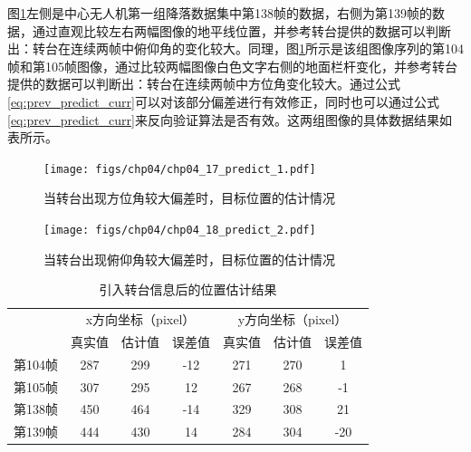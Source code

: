 图\ref{fig:chp04_17_predict_1}左侧是中心无人机第一组降落数据集中第138帧的数据，右侧为第139帧的数据，通过直观比较左右两幅图像的地平线位置，并参考转台提供的数据可以判断出：转台在连续两帧中俯仰角的变化较大。同理，图\ref{fig:chp04_17_predict_1}所示是该组图像序列的第104帧和第105帧图像，通过比较两幅图像白色文字右侧的地面栏杆变化，并参考转台提供的数据可以判断出：转台在连续两帧中方位角变化较大。通过公式\ref{eq:prev_predict_curr}可以对该部分偏差进行有效修正，同时也可以通过公式\ref{eq:prev_predict_curr}来反向验证算法是否有效。这两组图像的具体数据结果如表所示。

\begin{figure}[t]
	\centering
	\texttt{[image: figs/chp04/chp04\_17\_predict\_1.pdf]}
	\caption{当转台出现方位角较大偏差时，目标位置的估计情况}
	\label{fig:chp04_17_predict_1}
\end{figure}

\begin{figure}[ht]   
	\centering
	\texttt{[image: figs/chp04/chp04\_18\_predict\_2.pdf]}
	\caption{当转台出现俯仰角较大偏差时，目标位置的估计情况}
	\label{fig:chp04_18_predict_2}
\end{figure}

\begin{table}[]
	\centering
	\caption{引入转台信息后的位置估计结果}
	\label{my-label}
	\begin{tabular}{lccc|ccc}
		\hline
		& \multicolumn{3}{c|}{x方向坐标（pixel）}                         & \multicolumn{3}{c}{y方向坐标（pixel）}   \\ \cline{2-7} 
		& 真实值 & \multicolumn{1}{l}{估计值} & \multicolumn{1}{l|}{误差值} & 真实值 & 估计值 & \multicolumn{1}{l}{误差值} \\ \hline
		\multicolumn{1}{c}{第104帧} & 287 & 299                     & -12                      & 271 & 270 & 1                       \\
		\multicolumn{1}{c}{第105帧} & 307 & 295                     & 12                       & 267 & 268 & -1                      \\ \hline
		第138帧                     & 450 & 464                     & -14                      & 329 & 308 & 21                      \\
		第139帧                     & 444 & 430                     & 14                       & 284 & 304 & -20                     \\ \hline
	\end{tabular}
\end{table}

